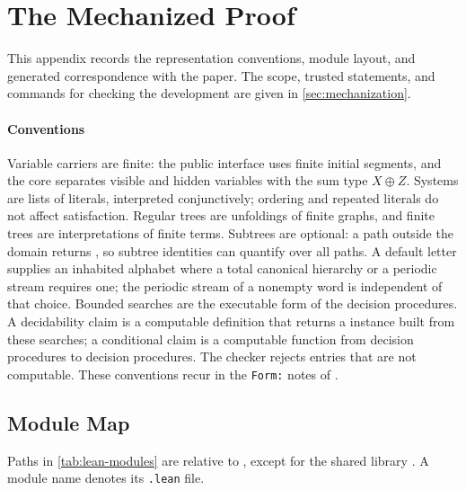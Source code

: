 \section{The Mechanized Proof}
\label{app:lean}

This appendix records the representation conventions, module layout, and
generated correspondence with the paper. The scope, trusted statements, and
commands for checking the development are given in \cref{sec:mechanization}.

\paragraph{Conventions}
Variable carriers are finite: the public interface uses finite initial
segments, and the core separates visible and hidden variables with the sum
type $X\oplus Z$. Systems are lists of literals, interpreted conjunctively;
ordering and repeated literals do not affect satisfaction. Regular trees are
unfoldings of finite graphs, and finite trees are interpretations of finite
terms. Subtrees are optional: a path outside the domain returns
, so subtree identities can quantify over all paths. A default
letter supplies an inhabited alphabet where a total canonical hierarchy or a
periodic stream requires one; the periodic stream of a nonempty word is
independent of that choice. Bounded searches are the executable form of the
decision procedures. A decidability claim is a computable definition that
returns a  instance built from these searches; a
conditional claim is a computable function from decision procedures to
decision procedures. The checker rejects entries that are not computable.
These conventions recur in the
\texttt{Form:} notes of .

\subsection{Module Map}
\label{app:lean-modules}

Paths in \cref{tab:lean-modules} are relative to , except
for the shared library . A module name denotes its
\texttt{.lean} file.

